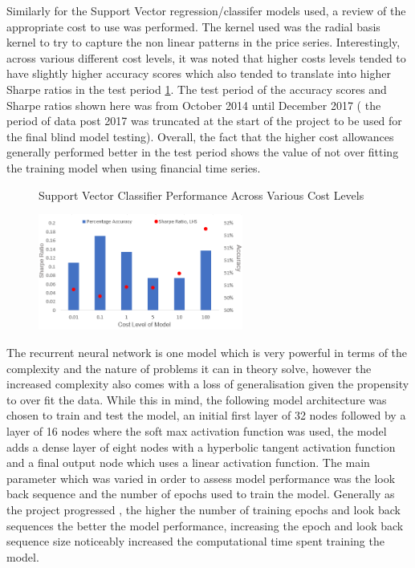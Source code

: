 \documentclass[11pt]{article}
\begin{document}
Similarly for the Support Vector regression/classifer models used, a review of the appropriate cost to use was performed. The kernel used was the radial basis kernel to try to capture the non linear patterns in the price series. Interestingly, across various different cost levels, it was noted that higher costs levels tended to have slightly higher accuracy scores which also tended to translate into higher Sharpe ratios in the test period \ref{fig:SVMCost}. The test period of the accuracy scores and Sharpe ratios shown here was from October 2014 until December 2017 ( the period of data post 2017 was truncated at the start of the project to be used for the final blind model testing). Overall, the fact that the higher cost allowances generally performed better in the test period shows the value of not over fitting the training model when using financial time series. 
\begin{figure}[h]
    \centering
	\caption{Support Vector Classifier Performance Across Various Cost Levels}    
	\includegraphics[width=0.6\textwidth]{SVMCost}
    \label{fig:SVMCost}
     \caption*{}
\end{figure}
The recurrent neural network is one model which is very powerful in terms of the complexity and the nature of problems it can in theory solve, however the increased complexity also comes with a loss of generalisation given the propensity to over fit the data. While this in mind, the following model architecture was chosen to train and test the model, an initial first layer of 32 nodes followed by a layer of 16 nodes where the soft max activation function was used, the model adds a dense layer of eight nodes with a hyperbolic tangent activation function and a final output node which uses a linear activation function. The main parameter which was varied in order to assess model performance was the look back sequence and the number of epochs used to train the model. Generally as the project progressed , the higher the number of training epochs and look back sequences the better the model performance, increasing the epoch and look back sequence size noticeably increased the computational time spent training the model.
\end{document}
